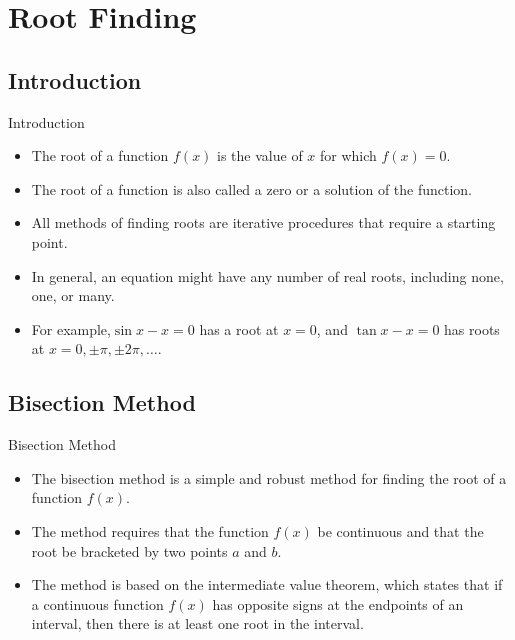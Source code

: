 \documentclass{beamer}
\begin{document}
\section[Root Finding]{Root Finding}
\subsection{Introduction}
\begin{frame}{Introduction}
\begin{itemize}
\item The root of a function $f(x)$ is the value of $x$ for which $f(x)=0$.
\item   The root of a function is also called a \alert{zero} or a \alert{solution} of the function.
\item  All methods of finding roots are iterative procedures that require a starting point.
\item In general, an equation might have any number of \alert{real} roots, including none, one, or many.
\item For example,$\sin x - x =0$ has a root at $x=0$, and $\tan x-x=0$ has roots at $x=0,\pm \pi, \pm 2\pi, \ldots$.
\end{itemize}

\end{frame}

\subsection{Bisection Method}
\begin{frame}{Bisection Method}
  \begin{itemize}
    \item The bisection method is a simple and robust method for finding the root of a function $f(x)$.
    \item The method requires that the function $f(x)$ be continuous and that the root be bracketed by two points $a$ and $b$.
    \item The method is based on the intermediate value theorem, which states that if a continuous function $f(x)$ has opposite signs at the endpoints of an interval, then there is at least one root in the interval.
  \end{itemize}
\end{frame}
\end{document}
